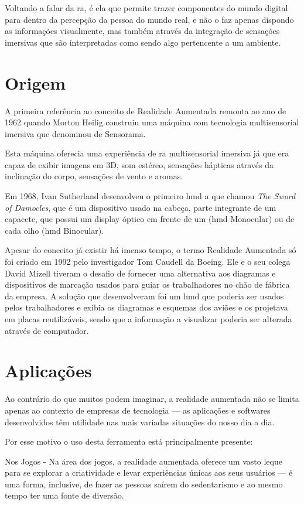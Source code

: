 \documentclass{report}
\begin{document}
Voltando a falar da \ac{ra}, é ela que permite trazer componentes do mundo digital para dentro da percepção da pessoa do mundo real, e não o faz apenas dispondo as informações visualmente, mas também através da integração de sensações imersivas que são interpretadas como sendo algo pertencente a um ambiente.

\section{Origem}
A primeira referência ao conceito de Realidade Aumentada remonta ao ano de 1962 quando Morton Heilig construiu uma máquina com tecnologia multisensorial imersiva que denominou de Sensorama.

Esta máquina oferecia uma experiência de \ac{ra} multisensorial imersiva já que era capaz de exibir imagens em 3D, som estéreo, sensações hápticas através da inclinação do corpo, sensações de vento e aromas.

Em 1968, Ivan Sutherland desenvolveu o primeiro \ac{hmd} a que chamou \textit{The Sword of Damocles}, que é um dispositivo usado na cabeça, parte integrante de um capacete, que possui um display óptico em frente de um (\ac{hmd} Monocular) ou de cada olho (\ac{hmd} Binocular).

Apesar do conceito já existir há imenso tempo, o termo Realidade Aumentada só foi criado em 1992 pelo investigador Tom Caudell da Boeing. Ele e o seu colega David Mizell tiveram o desafio de fornecer uma alternativa aos diagramas e dispositivos de marcação usados para guiar os trabalhadores no chão de fábrica da empresa. A solução que desenvolveram foi um \ac{hmd} que poderia ser usados pelos trabalhadores e exibia os diagramas e esquemas dos aviões e os projetava em placas reutilizáveis, sendo que a informação a visualizar poderia ser alterada através de computador.

\section{Aplicações}
Ao contrário do que muitos podem imaginar, a realidade aumentada não se limita apenas ao contexto de empresas de tecnologia — as aplicações e softwares desenvolvidos têm utilidade nas mais variadas situações do nosso dia a dia.

Por esse motivo o uso desta ferramenta está principalmente presente:

Nos Jogos - Na área dos jogos, a realidade aumentada oferece um vasto leque para se explorar a criatividade e levar experiências únicas aos seus usuários — é uma forma, inclusive, de fazer as pessoas saírem do sedentarismo e ao mesmo tempo ter uma fonte de diversão.
\end{document}
